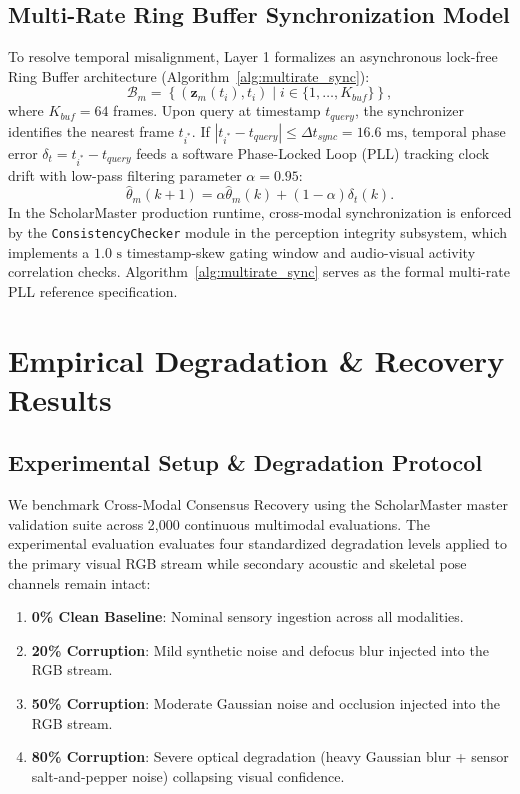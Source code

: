 \documentclass[conference]{IEEEtran}
\begin{document}
\subsection{Multi-Rate Ring Buffer Synchronization Model}
To resolve temporal misalignment, Layer 1 formalizes an asynchronous lock-free Ring Buffer architecture (Algorithm~\ref{alg:multirate_sync}):
\begin{equation}
\mathcal{B}_m = \left\{ (\mathbf{z}_m(t_i), t_i) \mid i \in \{1, \dots, K_{buf}\} \right\},
\end{equation}
where $K_{buf} = 64$ frames. Upon query at timestamp $t_{query}$, the synchronizer identifies the nearest frame $t_{i^*}$. If $|t_{i^*} - t_{query}| \le \Delta t_{sync} = 16.6\text{ ms}$, temporal phase error $\delta_t = t_{i^*} - t_{query}$ feeds a software Phase-Locked Loop (PLL) tracking clock drift with low-pass filtering parameter $\alpha = 0.95$:
\begin{equation}
\hat{\theta}_m(k+1) = \alpha \hat{\theta}_m(k) + (1 - \alpha) \delta_t(k).
\end{equation}
In the ScholarMaster production runtime, cross-modal synchronization is enforced by the \texttt{ConsistencyChecker} module in the perception integrity subsystem, which implements a $1.0\text{ s}$ timestamp-skew gating window and audio-visual activity correlation checks. Algorithm~\ref{alg:multirate_sync} serves as the formal multi-rate PLL reference specification.

\section{Empirical Degradation \& Recovery Results}
\subsection{Experimental Setup \& Degradation Protocol}
We benchmark Cross-Modal Consensus Recovery using the ScholarMaster master validation suite across 2,000 continuous multimodal evaluations. The experimental evaluation evaluates four standardized degradation levels applied to the primary visual RGB stream while secondary acoustic and skeletal pose channels remain intact:
\begin{enumerate}
    \item \textbf{0\% Clean Baseline}: Nominal sensory ingestion across all modalities.
    \item \textbf{20\% Corruption}: Mild synthetic noise and defocus blur injected into the RGB stream.
    \item \textbf{50\% Corruption}: Moderate Gaussian noise and occlusion injected into the RGB stream.
    \item \textbf{80\% Corruption}: Severe optical degradation (heavy Gaussian blur + sensor salt-and-pepper noise) collapsing visual confidence.
\end{enumerate}
\end{document}
